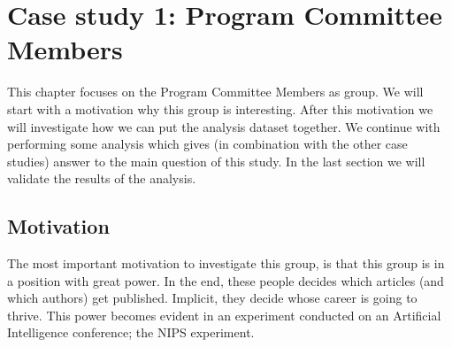 \documentclass{ou-report}
\newcommand{\outline}[1]{{\color{blue} #1}}
\begin{document}
\chapter{Case study 1: Program Committee Members}
\label{chp:case1}
This chapter focuses on the Program Committee Members as group. We will start 
with a motivation why this group is interesting. After this motivation we will
investigate how we can put the analysis dataset together. 
We continue with performing some analysis which gives (in combination with the 
other case studies) answer to the main question of this study. In the last 
section we will validate the results of the analysis.

\section{Motivation}
The most important motivation to investigate this group, is that this group is 
in a position with great power. In the end, these people decides which articles
(and which authors) get published. Implicit, they decide whose career is going 
to thrive.
This power becomes evident in an experiment conducted on an Artificial
Intelligence conference; the NIPS experiment.


\end{document}
